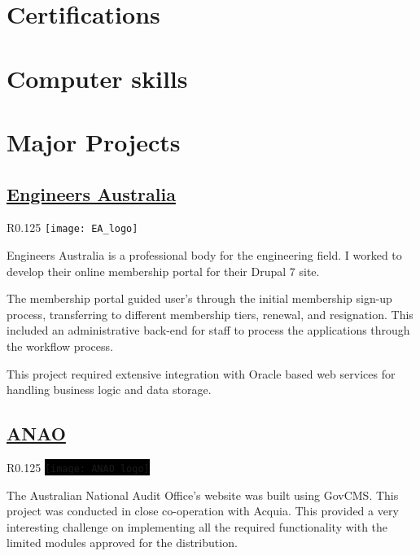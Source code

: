 \documentclass[11pt,a4paper,sans]{moderncv}        %
\begin{document}
\section{Certifications}

\section{Computer skills}

\clearpage
\section{Major Projects}
  \subsection{\href{https://www.engineersaustralia.org.au/}{Engineers Australia}}
    \begin{wrapfigure}{R}{0.125\textwidth}
      \vspace{-10pt}
      \texttt{[image: EA\_logo]}
      \vspace{-20pt}
    \end{wrapfigure}
    Engineers Australia is a professional body for the engineering field. I worked to develop their online membership portal for their Drupal 7 site.

    The membership portal guided user's through the initial membership sign-up process, transferring to different membership tiers, renewal, and resignation. This included an administrative back-end for staff to process the applications through the workflow process.

    This project required extensive integration with Oracle based web services for handling business logic and data storage.

  \subsection{\href{https://www.anao.gov.au/}{\ac{ANAO}}}
    \begin{wrapfigure}{R}{0.125\textwidth}
      \vspace{-15pt}
      \colorbox{black}{\texttt{[image: ANAO\_logo]}}
      \vspace{-25pt}
    \end{wrapfigure}
    The Australian National Audit Office's website was built using GovCMS\@. This project was conducted in close co-operation with Acquia. This provided a very interesting challenge on implementing all the required functionality with the limited modules approved for the distribution.
\end{document}
